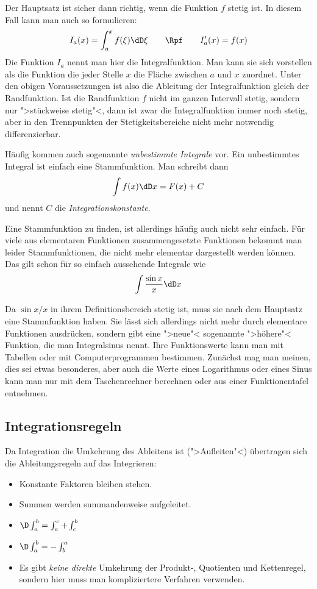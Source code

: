 Der Hauptsatz ist sicher dann richtig, wenn die Funktion $f$ stetig ist.
In diesem Fall kann man auch so formulieren:
\[
I_a(x)=\int_a^x f(\xi)\dD \xi \qquad\Rpf\qquad I_a'(x)=f(x)
\]
Die Funktion $I_a$ nennt man hier die Integralfunktion. Man kann sie sich
vorstellen als die Funktion die jeder Stelle $x$ die Fläche zwischen $a$ und
$x$ zuordnet. Unter den obigen Voraussetzungen ist also die Ableitung der
Integralfunktion gleich der Randfunktion. Ist die Randfunktion $f$ nicht im
ganzen Intervall stetig, sondern nur ">stückweise stetig"<, dann ist zwar die
Integralfunktion immer noch stetig, aber in den Trennpunkten der
Stetigkeitsbereiche nicht mehr notwendig differenzierbar.

Häufig kommen auch sogenannte \emph{unbestimmte Integrale} vor. Ein
unbestimmtes Integral ist einfach eine Stammfunktion. Man schreibt dann
\[
\int f(x)\dD x= F(x)+C
\]
und nennt $C$ die \emph{Integrationskonstante}.

Eine Stammfunktion zu finden, ist allerdings häufig auch nicht sehr einfach.
Für viele aus elementaren Funktionen zusammengesetzte Funktionen bekommt man
leider Stammfunktionen, die nicht mehr elementar dargestellt werden können. Das gilt
schon für so einfach aussehende Integrale wie
\[
\int \frac{\sin x}{x}\dD x
\]

Da $\sin x /x$ in ihrem Definitionsbereich stetig ist, muss sie nach dem
Hauptsatz eine Stammfunktion haben. Sie lässt sich allerdings nicht mehr durch
elementare Funktionen ausdrücken, sondern gibt eine ">neue"< sogenannte
">höhere"< Funktion, die man Integralsinus nennt. Ihre Funktionswerte kann man
mit Tabellen oder mit Computerprogrammen bestimmen. Zunächst mag man meinen,
dies sei etwas besonderes, aber auch die Werte eines Logarithmus oder eines
Sinus kann man nur mit dem Taschenrechner berechnen oder aus einer
Funktionentafel entnehmen.

\subsection{Integrationsregeln}

Da Integration die Umkehrung des Ableitens ist (">Aufleiten"<) übertragen sich
die Ableitungsregeln auf das Integrieren:
\begin{itemize}
\item Konstante Faktoren bleiben stehen.
\item Summen werden summandenweise aufgeleitet.
\item $\D\int_a^b=\int_a^c+\int_c^b$
\item $\D \int_a^b=-\int_b^a$
\item Es gibt \emph{keine direkte} Umkehrung der Produkt-, Quotienten und
  Kettenregel, sondern hier muss man kompliziertere Verfahren verwenden.
\end{itemize}

